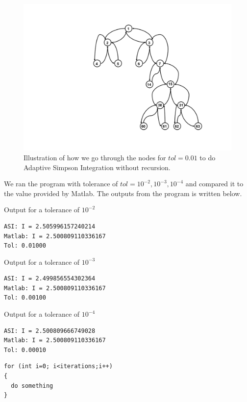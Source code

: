 \documentclass[a4paper,10pt]{article}
\begin{document}
\begin{figure}[h!]
	\centering
	\includegraphics[width=\textwidth]{tree_graph}
	\caption{Illustration of how we go through the nodes for $tol=0.01$ to do Adaptive Simpson Integration without recursion.}
	\label{fig: tree}
\end{figure}

We ran the program with tolerance of $tol=10^{-2}, 10^{-3}, 10^{-4}$ and compared it to the value provided by Matlab. The outputs from the program is written below.
\newline

Output for a tolerance of $10^{-2}$
\begin{center}
\begin{lstlisting}
ASI: I = 2.505996157240214
Matlab: I = 2.500809110336167
Tol: 0.01000
\end{lstlisting}
\end{center}

Output for a tolerance of $10^{-3}$
\begin{center}
\begin{lstlisting}
ASI: I = 2.499856554302364
Matlab: I = 2.500809110336167
Tol: 0.00100
\end{lstlisting}
\end{center}

Output for a tolerance of $10^{-4}$
\begin{center}
\begin{lstlisting}
ASI: I = 2.500809666749028
Matlab: I = 2.500809110336167
Tol: 0.00010
\end{lstlisting}
\end{center}

\newpage
\begin{center}
\begin{minipage}[t]{85mm}
\begin{lstlisting}
for (int i=0; i<iterations;i++)
{
  do something
}
\end{lstlisting}
\end{minipage}
\end{center}

%
\end{document}
